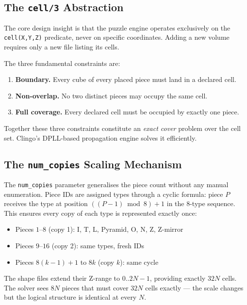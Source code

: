 \documentclass[a4paper,UKenglish,cleveref,autoref]{lipics-v2021}
\begin{document}
\subsection{The \texttt{cell/3} Abstraction}

The core design insight is that the puzzle engine operates exclusively on the
\texttt{cell(X,Y,Z)} predicate, never on specific coordinates.  Adding a new
volume requires only a new file listing its cells.

The three fundamental constraints are:

\begin{enumerate}[\bfseries (1)]
  \item \textbf{Boundary.}  Every cube of every placed piece must land in a
        declared cell.
  \item \textbf{Non-overlap.}  No two distinct pieces may occupy the same cell.
  \item \textbf{Full coverage.}  Every declared cell must be occupied by exactly
        one piece.
\end{enumerate}

Together these three constraints constitute an \emph{exact cover} problem over
the cell set.  Clingo's DPLL-based propagation engine solves it efficiently.

\subsection{The \texttt{num\_copies} Scaling Mechanism}

The \texttt{num\_copies} parameter generalises the piece count without any
manual enumeration.  Piece IDs are assigned types through a cyclic formula:
piece $P$ receives the type at position $((P-1) \bmod 8) + 1$ in the
8-type sequence.  This ensures every copy of each type is represented exactly
once:

\begin{itemize}
  \item Pieces $1$--$8$ (copy 1): I, T, L, Pyramid, O, N, Z, Z-mirror
  \item Pieces $9$--$16$ (copy 2): same types, fresh IDs
  \item Pieces $8(k{-}1){+}1$ to $8k$ (copy $k$): same cycle
\end{itemize}

The shape files extend their Z-range to $0..2N{-}1$, providing exactly $32N$
cells.  The solver sees $8N$ pieces that must cover $32N$ cells exactly ---
the scale changes but the logical structure is identical at every $N$.
\end{document}
